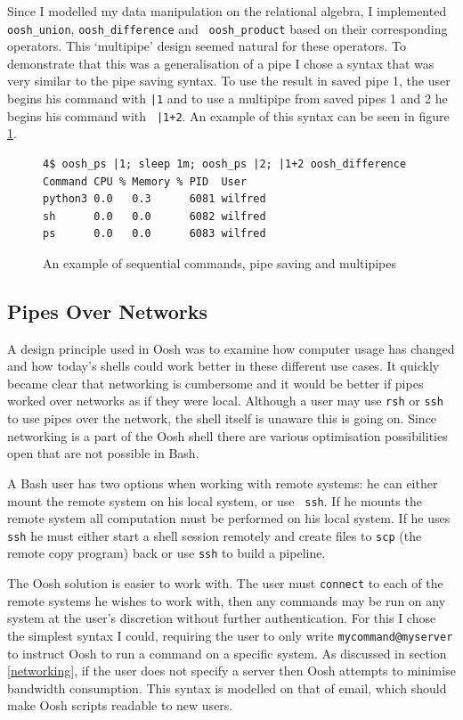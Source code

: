 \documentclass[12pt,twoside,notitlepage]{report}
\begin{document}
Since I modelled my data manipulation on the relational algebra, I
implemented {\tt oosh\_union}, {\tt oosh\_difference} and {\tt
  oosh\_product} based on their corresponding operators. This
`multipipe' design seemed natural for these operators. To demonstrate
that this was a generalisation of a pipe I chose a syntax that was
very similar to the pipe saving syntax. To use the result in saved
pipe 1, the user begins his command with {\tt |1} and to use a
multipipe from saved pipes 1 and 2 he begins his command with {\tt
  |1+2}. An example of this syntax can be seen in figure \ref{multipipe}.

\begin{figure}[h]
\begin{Verbatim}[frame=single,framerule=0.2pt,framesep=5pt]
4$ oosh_ps |1; sleep 1m; oosh_ps |2; |1+2 oosh_difference
Command CPU % Memory % PID  User
python3 0.0   0.3      6081 wilfred
sh      0.0   0.0      6082 wilfred
ps      0.0   0.0      6083 wilfred
\end{Verbatim}
\caption{An example of sequential commands, pipe saving and
  multipipes}
\label{multipipe}
\end{figure}

\subsection{Pipes Over Networks}

A design principle used in Oosh was to examine how computer usage has
changed and how today's shells could work better in these different
use cases. It quickly became clear that networking is cumbersome and
it would be better if pipes worked over networks as if they were
local. Although a user may use {\tt rsh} or {\tt ssh} to use pipes
over the network, the shell itself is unaware this is going on. Since
networking is a part of the Oosh shell there are various optimisation
possibilities open that are not possible in Bash.

A Bash user has two options when working with remote systems: he can
either mount the remote system on his local system, or use {\tt
  ssh}. If he mounts the remote system all computation must be
performed on his local system. If he uses {\tt ssh} he must either
start a shell session remotely and create files to {\tt scp} (the
remote copy program) back or use {\tt ssh} to build a pipeline.

The Oosh solution is easier to work with. The user must {\tt connect}
to each of the remote systems he wishes to work with, then any
commands may be run on any system at the user's discretion without
further authentication. For this I chose the simplest syntax I could,
requiring the user to only write {\tt mycommand@myserver} to instruct
Oosh to run a command on a specific system. As discussed in section
\ref{networking}, if the user does not specify a server then Oosh
attempts to minimise bandwidth consumption. This syntax is modelled on
that of email, which should make Oosh scripts readable to new users.
\end{document}
